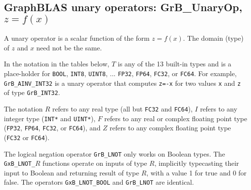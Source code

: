 \documentclass[12pt]{article}
\begin{document}
\newpage
\subsection{GraphBLAS unary operators: {\sf GrB\_UnaryOp}, $z=f(x)$} %
\label{unaryop}

A unary operator is a scalar function of the form $z=f(x)$.  The domain (type)
of $z$ and $x$ need not be the same.

In the notation in the tables
below, $T$ is any of the 13 built-in types and is a place-holder for
\verb'BOOL', \verb'INT8', \verb'UINT8', ... 
\verb'FP32', \verb'FP64', \verb'FC32', or \verb'FC64'.
For example, \verb'GrB_AINV_INT32' is a unary operator that computes
\verb'z=-x' for two values \verb'x' and \verb'z' of type \verb'GrB_INT32'.

The notation $R$ refers to any real type (all but \verb'FC32' and \verb'FC64'),
$I$ refers to any integer type (\verb'INT*' and \verb'UINT*'),
$F$ refers to any real or complex floating point type
(\verb'FP32', \verb'FP64', \verb'FC32', or \verb'FC64'),
and $Z$ refers to any complex floating point type
(\verb'FC32' or \verb'FC64').

The logical negation operator \verb'GrB_LNOT' only works on Boolean types.  The
\verb'GxB_LNOT_'$R$ functions operate on inputs of type $R$, implicitly
typecasting their input to Boolean and returning result of type $R$, with a
value 1 for true and 0 for false.  The operators \verb'GxB_LNOT_BOOL' and
\verb'GrB_LNOT' are identical.
\end{document}

